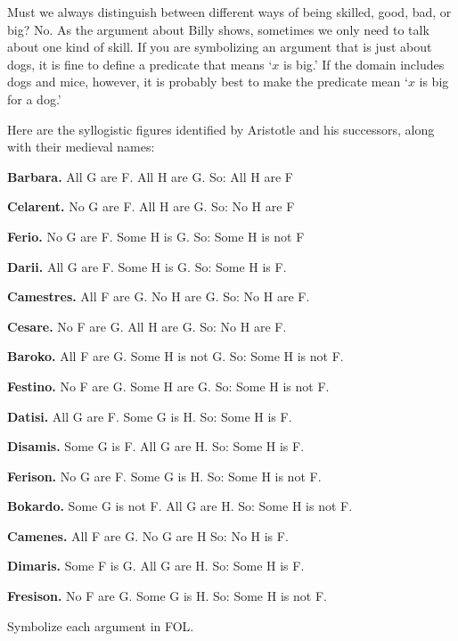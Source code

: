 Must we always distinguish between different ways of being skilled, good, bad, or big? No. As the argument about Billy shows, sometimes we only need to talk about one kind of skill. If you are symbolizing an argument that is just about dogs, it is fine to define a predicate that means `$x$ is big.' If the domain includes dogs and mice, however, it is probably best to make the predicate mean `$x$ is big for a dog.'



\practiceproblems
\problempart
\label{pr.BarbaraEtc}
Here are the syllogistic figures identified by Aristotle and his successors, along with their medieval names:
\begin{ebullet}
	\item \textbf{Barbara.} All G are F. All H are G. So:  All H are F
	\item \textbf{Celarent.} No G are F. All H are G. So: No H are F
	\item \textbf{Ferio.} No G are F. Some H is G. So: Some H is not F
	\item \textbf{Darii.} All G are F. Some H is G. So: Some H is F.
	\item \textbf{Camestres.} All F are G. No H are G. So: No H are F.
	\item \textbf{Cesare.} No F are G. All H are G. So: No H are F.
	\item \textbf{Baroko.} All F are G. Some H is not G. So: Some H is not F.
	\item \textbf{Festino.} No F are G. Some H are G. So: Some H is not F.
	\item \textbf{Datisi.} All G are F. Some G is H. So: Some H is F.
	\item \textbf{Disamis.} Some G is F. All G are H. So: Some H is F.
	\item \textbf{Ferison.} No G are F. Some G is H. So: Some H is not F.
	\item \textbf{Bokardo.} Some G is not F. All G are H. So:  Some H is not F.
	\item \textbf{Camenes.} All F are G. No G are H So: No H is F.
	\item \textbf{Dimaris.} Some F is G. All G are H. So: Some H is F.
	\item \textbf{Fresison.} No F are G. Some G is H. So: Some H is not F.
\end{ebullet}
Symbolize each argument in FOL.

